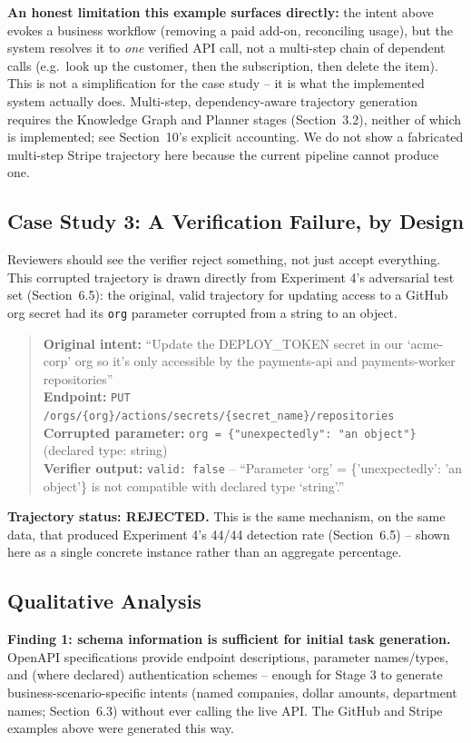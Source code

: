 \documentclass[11pt]{article}
\begin{document}
\textbf{An honest limitation this example surfaces directly:} the intent above evokes a business
workflow (removing a paid add-on, reconciling usage), but the system resolves it to \textit{one}
verified API call, not a multi-step chain of dependent calls (e.g.\ look up the customer, then the
subscription, then delete the item). This is not a simplification for the case study -- it is what
the implemented system actually does. Multi-step, dependency-aware trajectory generation requires
the Knowledge Graph and Planner stages (Section~3.2), neither of which is implemented; see
Section~10's explicit accounting. We do not show a fabricated multi-step Stripe trajectory here
because the current pipeline cannot produce one.

\subsection{Case Study 3: A Verification Failure, by Design}
Reviewers should see the verifier reject something, not just accept everything. This corrupted
trajectory is drawn directly from Experiment 4's adversarial test set (Section~6.5): the original,
valid trajectory for updating access to a GitHub org secret had its \texttt{org} parameter
corrupted from a string to an object.
\begin{quote}
\small
\textbf{Original intent:} ``Update the DEPLOY\_TOKEN secret in our `acme-corp' org so it's only
accessible by the payments-api and payments-worker repositories'' \\
\textbf{Endpoint:} \texttt{PUT /orgs/\{org\}/actions/secrets/\{secret\_name\}/repositories} \\
\textbf{Corrupted parameter:} \texttt{org = \{"unexpectedly": "an object"\}} (declared type:
string) \\
\textbf{Verifier output:} \texttt{valid: false} -- ``Parameter `org' = \{'unexpectedly': 'an
object'\} is not compatible with declared type `string'.''
\end{quote}
\textbf{Trajectory status: REJECTED.} This is the same mechanism, on the same data, that produced
Experiment 4's 44/44 detection rate (Section~6.5) -- shown here as a single concrete instance
rather than an aggregate percentage.

\subsection{Qualitative Analysis}

\textbf{Finding 1: schema information is sufficient for initial task generation.} OpenAPI
specifications provide endpoint descriptions, parameter names/types, and (where declared)
authentication schemes -- enough for Stage 3 to generate business-scenario-specific intents
(named companies, dollar amounts, department names; Section~6.3) without ever calling the live
API. The GitHub and Stripe examples above were generated this way.
\end{document}
